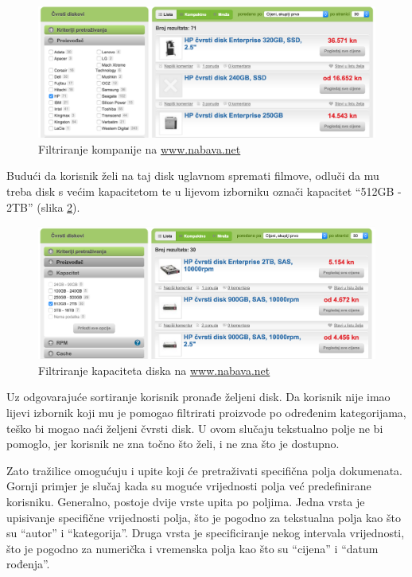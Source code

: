 \documentclass[a4paper,twoside,12pt]{scrreprt}
\begin{document}
\begin{figure}[H]
  \centering
  \includegraphics[width=\textwidth]{nabava2}
  \caption{Filtriranje kompanije na \url{www.nabava.net}}
  \label{nabava2}
\end{figure}

Budući da korisnik želi na taj disk uglavnom spremati filmove, odluči da mu treba disk s većim kapacitetom te u lijevom izborniku označi kapacitet ``512GB - 2TB'' (slika \ref{nabava3}).

\begin{figure}[H]
  \centering
  \includegraphics[width=\textwidth]{nabava3}
  \caption{Filtriranje kapaciteta diska na \url{www.nabava.net}}
  \label{nabava3}
\end{figure}

Uz odgovarajuće sortiranje korisnik pronađe željeni disk. Da korisnik nije imao lijevi izbornik koji mu je pomogao filtrirati proizvode po određenim kategorijama, teško bi mogao naći željeni čvrsti disk. U ovom slučaju tekstualno polje ne bi pomoglo, jer korisnik ne zna točno što želi, i ne zna što je dostupno.

Zato tražilice omogućuju i upite koji će pretraživati specifična polja dokumenata. Gornji primjer je slučaj kada su moguće vrijednosti polja već predefinirane korisniku. Generalno, postoje dvije vrste upita po poljima. Jedna vrsta je upisivanje specifične vrijednosti polja, što je pogodno za tekstualna polja kao što su ``autor'' i ``kategorija''. Druga vrsta je specificiranje nekog intervala vrijednosti, što je pogodno za numerička i vremenska polja kao što su ``cijena'' i ``datum rođenja''.
\end{document}

